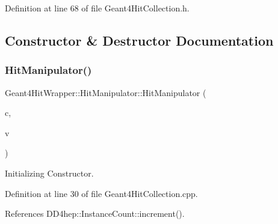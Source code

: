 Definition at line 68 of file Geant4\+Hit\+Collection.\+h.



\subsection{Constructor \& Destructor Documentation}
\hypertarget{class_d_d4hep_1_1_simulation_1_1_geant4_hit_wrapper_1_1_hit_manipulator_ab04f459fb64ae024b2dcf7f7fb0d7775}{}\label{class_d_d4hep_1_1_simulation_1_1_geant4_hit_wrapper_1_1_hit_manipulator_ab04f459fb64ae024b2dcf7f7fb0d7775} 
\subsubsection{\texorpdfstring{Hit\+Manipulator()}{HitManipulator()}}
{\footnotesize\ttfamily Geant4\+Hit\+Wrapper\+::\+Hit\+Manipulator\+::\+Hit\+Manipulator (\begin{DoxyParamCaption}\item[{const \hyperlink{class_d_d4hep_1_1_component_cast}{Component\+Cast} \&}]{c,  }\item[{const \hyperlink{class_d_d4hep_1_1_component_cast}{Component\+Cast} \&}]{v }\end{DoxyParamCaption})}



Initializing Constructor. 



Definition at line 30 of file Geant4\+Hit\+Collection.\+cpp.



References D\+D4hep\+::\+Instance\+Count\+::increment().

\hypertarget{class_d_d4hep_1_1_simulation_1_1_geant4_hit_wrapper_1_1_hit_manipulator_a61e4ad1fbefa9c366136011854d033e0}{}\label{class_d_d4hep_1_1_simulation_1_1_geant4_hit_wrapper_1_1_hit_manipulator_a61e4ad1fbefa9c366136011854d033e0} 

